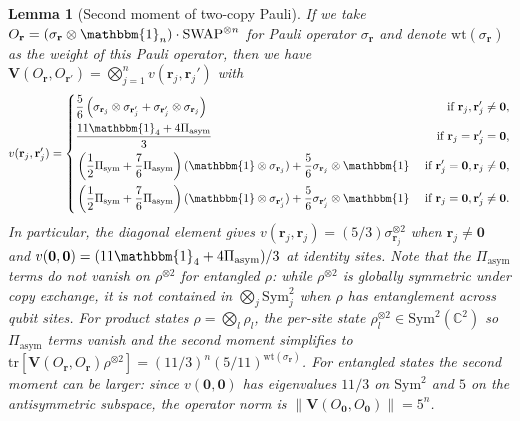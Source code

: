 \documentclass[aps,%
twocolumn,%
floatfix,%
pra,%
amsfonts,%
groupedaddress,%
superscriptaddress]{revtex4-2}%
\newtheorem{lemma}{Lemma}
\newcommand{\1}{\mathbbm{1}}
\begin{document}
\begin{lemma}[Second moment of two-copy Pauli]\label{lemma:covar_Pauli}
    If we take $O_{\mathbf{r}}= (\sigma_{\mathbf{r}} \otimes \1_n) \cdot \text{SWAP}^{\otimes n}$ for Pauli operator $\sigma_{\mathbf{r}}$ and denote $\text{wt}(\sigma_{\mathbf{r}})$ as the weight of this Pauli operator, then we have $\mathbf{V}(O_{\mathbf{r}}, O_{\mathbf{r}'}) = \bigotimes_{j = 1}^n v(\mathbf{r}_j, \mathbf{r}_j') $ with
    \begin{align}\label{eq:v_full_operator}
        v(\mathbf{r}_j, \mathbf{r}_j') =
        \left\{\begin{aligned}
            &\frac{5}{6}\left(\sigma_{\mathbf{r}_j}\otimes \sigma_{\mathbf{r}'_j} +\sigma_{\mathbf{r}'_j}\otimes \sigma_{\mathbf{r}_j} \right)&\text{~if~} \mathbf{r}_j, \mathbf{r}_j'  \neq \mathbf{0},\\
            &\frac{11\1_4 + 4 \Pi_{\mathrm{asym}}}{3} &\text{~if~} \mathbf{r}_j=\mathbf{r}_j'= \mathbf{0}, \\
            &\left(\frac{1}{2} \Pi_{\mathrm{sym}} + \frac{7}{6} \Pi_{\mathrm{asym}}\right)(\1 \otimes \sigma_{\mathbf{r}_j})+ \frac{5}{6}\sigma_{\mathbf{r}_j}\otimes\1 &\text{~if~} \mathbf{r}_j' = \mathbf{0},  \mathbf{r}_j\neq \mathbf{0},\\
            &\left(\frac{1}{2} \Pi_{\mathrm{sym}} + \frac{7}{6} \Pi_{\mathrm{asym}}\right)(\1 \otimes \sigma_{\mathbf{r}'_j}) + \frac{5}{6}\sigma_{\mathbf{r}'_j}\otimes\1&\text{~if~} \mathbf{r}_j = \mathbf{0},  \mathbf{r}'_j\neq \mathbf{0}.
        \end{aligned}\right.
    \end{align}
    In particular, the diagonal element gives $v(\mathbf{r}_j,\mathbf{r}_j) = ({5}/{3})\sigma_{\mathbf{r}_j}^{\otimes 2}$ when $\mathbf{r}_j \neq \mathbf{0}$ and $v(\mathbf{0},\mathbf{0}) = ({11\1_4 + 4 \Pi_{\mathrm{asym}}})/{3}$ at identity sites. Note that the $\Pi_{\mathrm{asym}}$ terms do \emph{not} vanish on $\rho^{\otimes 2}$ for entangled $\rho$: while $\rho^{\otimes 2}$ is globally symmetric under copy exchange, it is not contained in $\bigotimes_j \mathrm{Sym}^2_j$ when $\rho$ has entanglement across qubit sites. For product states $\rho = \bigotimes_l \rho_l$, the per-site state $\rho_l^{\otimes 2} \in \mathrm{Sym}^2(\mathbb{C}^2)$ so $\Pi_{\mathrm{asym}}$ terms vanish and the second moment simplifies to $\mathrm{tr}[\mathbf{V}(O_{\mathbf{r}},O_{\mathbf{r}})\rho^{\otimes 2}] = ({11}/{3})^{n}({5}/{11})^{\mathrm{wt}(\sigma_{\mathbf{r}})}$. For entangled states the second moment can be larger: since $v(\mathbf{0},\mathbf{0})$ has eigenvalues $11/3$ on $\mathrm{Sym}^2$ and $5$ on the antisymmetric subspace, the operator norm is $\|\mathbf{V}(O_\mathbf{0},O_\mathbf{0})\| = 5^n$.
\end{lemma}
\end{document}
